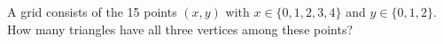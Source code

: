 A grid consists of the 15 points $(x,y)$ with $x\in\{0,1,2,3,4\}$ and $y\in\{0,1,2\}$. How many triangles have all three vertices among these points?
